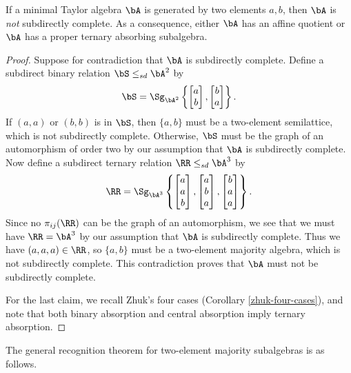 \begin{cor}\label{not-sd-complete} If a minimal Taylor algebra $\bA$ is generated by two elements $a,b$, then $\bA$ is \emph{not} subdirectly complete. As a consequence, either $\bA$ has an affine quotient or $\bA$ has a proper ternary absorbing subalgebra.
\end{cor}
\begin{proof} Suppose for contradiction that $\bA$ is subdirectly complete. Define a subdirect binary relation $\bS \le_{sd} \bA^2$ by
\[
\bS = \Sg_{\bA^2}\left\{\begin{bmatrix} a\\ b\end{bmatrix}, \begin{bmatrix} b\\ a\end{bmatrix}\right\}.
\]
If $(a,a)$ or $(b,b)$ is in $\bS$, then $\{a,b\}$ must be a two-element semilattice, which is not subdirectly complete. Otherwise, $\bS$ must be the graph of an automorphism of order two by our assumption that $\bA$ is subdirectly complete. Now define a subdirect ternary relation $\RR \le_{sd} \bA^3$ by
\[
\RR = \Sg_{\bA^3}\left\{\begin{bmatrix} a\\ a\\ b\end{bmatrix}, \begin{bmatrix} a\\ b\\ a\end{bmatrix}, \begin{bmatrix} b\\ a\\ a\end{bmatrix}\right\}.
\]
Since no $\pi_{ij}(\RR)$ can be the graph of an automorphism, we see that we must have $\RR = \bA^3$ by our assumption that $\bA$ is subdirectly complete. Thus we have $(a,a,a) \in \RR$, so $\{a,b\}$ must be a two-element majority algebra, which is not subdirectly complete. This contradiction proves that $\bA$ must not be subdirectly complete.

For the last claim, we recall Zhuk's four cases (Corollary \ref{zhuk-four-cases}), and note that both binary absorption and central absorption imply ternary absorption.
\end{proof}

The general recognition theorem for two-element majority subalgebras is as follows.


